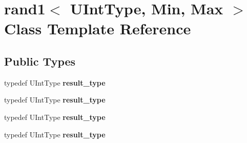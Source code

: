 \hypertarget{classrand1}{}\section{rand1$<$ U\+Int\+Type, Min, Max $>$ Class Template Reference}
\label{classrand1}
\subsection*{Public Types}
\begin{DoxyCompactItemize}
\item 
\mbox{\label{classrand1_a936906420768a25c501ff81c5fe3c4ec}} 
typedef U\+Int\+Type {\bfseries result\+\_\+type}
\item 
\mbox{\label{classrand1_a936906420768a25c501ff81c5fe3c4ec}} 
typedef U\+Int\+Type {\bfseries result\+\_\+type}
\item 
\mbox{\label{classrand1_a936906420768a25c501ff81c5fe3c4ec}} 
typedef U\+Int\+Type {\bfseries result\+\_\+type}
\item 
\mbox{\label{classrand1_a936906420768a25c501ff81c5fe3c4ec}} 
typedef U\+Int\+Type {\bfseries result\+\_\+type}
\end{DoxyCompactItemize}
